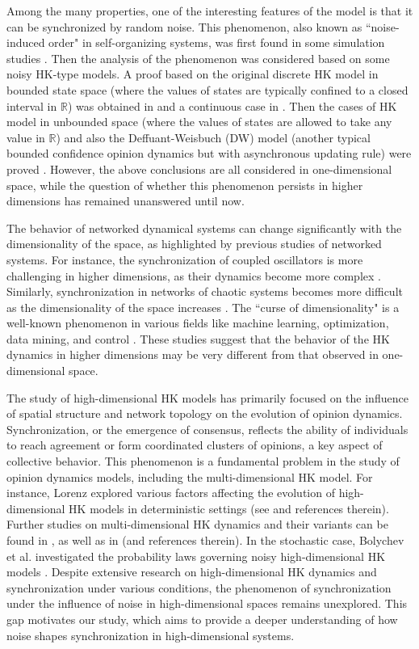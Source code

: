 \documentclass[11pt]{article}
\theoremstyle{definition}
\theoremstyle{remark}
\numberwithin{equation}{section}
\begin{document}
Among the many properties, one of the interesting features of the model is that it can be synchronized by random noise. This phenomenon, also known as ``noise-induced order" in self-organizing systems, was first found in some simulation studies \cite{Mas2010,Carro2013,Pineda2013}. Then the analysis of the phenomenon was considered based on some noisy HK-type models. A proof based on the original discrete HK model in bounded state space (where the values of states are typically confined to a closed interval in $\mathbb{R}$) was obtained in \cite{Su2017auto} and a continuous case in \cite{Wang2017}. Then the cases of HK model in unbounded space (where the values of states are allowed to take any value in $\mathbb{R}$) \cite{Su2019tac} and also the Deffuant-Weisbuch (DW) model (another typical bounded confidence opinion dynamics but with asynchronous updating rule\cite{Deffuant2000}) were proved \cite{Su2022cs}. However, the above conclusions are all considered in one-dimensional space, while the question of whether this phenomenon persists in higher dimensions has remained unanswered until now.

The behavior of networked dynamical systems can change significantly with the dimensionality of the space, as highlighted by previous studies of networked systems. For instance, the synchronization of coupled oscillators is more challenging in higher dimensions, as their dynamics become more complex \cite{Parsegov2017}. Similarly, synchronization in networks of chaotic systems becomes more difficult as the dimensionality of the space increases \cite{Balanov2009}. The ``curse of dimensionality" is a well-known phenomenon in various fields like machine learning, optimization, data mining, and control \cite{Bellman1961,Aggarwal2001}. These studies suggest that the behavior of the HK dynamics in higher dimensions may be very different from that observed in one-dimensional space.

The study of high-dimensional HK models has primarily focused on the influence of spatial structure and network topology on the evolution of opinion dynamics. Synchronization, or the emergence of consensus, reflects the ability of individuals to reach agreement or form coordinated clusters of opinions, a key aspect of collective behavior. This phenomenon is a fundamental problem in the study of opinion dynamics models, including the multi-dimensional HK model. For instance, Lorenz explored various factors affecting the evolution of high-dimensional HK models in deterministic settings (see \cite{Lorenz2007, Lorenz2008} and references therein). Further studies on multi-dimensional HK dynamics and their variants can be found in \cite{Basar2015, Nedic2012, Parsegov2017, Chazelle2017, Pasquale2022}, as well as in \cite{Bernardo2024} (and references therein). In the stochastic case, Bolychev et al. investigated the probability laws governing noisy high-dimensional HK models \cite{Bolychev2021}.
Despite extensive research on high-dimensional HK dynamics and synchronization under various conditions, the phenomenon of synchronization under the influence of noise in high-dimensional spaces remains unexplored. This gap motivates our study, which aims to provide a deeper understanding of how noise shapes synchronization in high-dimensional systems.
\end{document}
